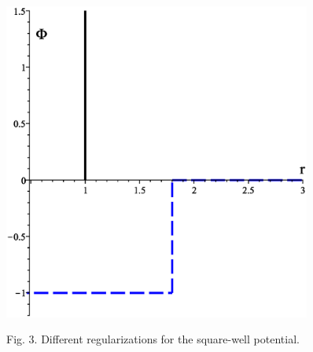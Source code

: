 \documentclass[8pt]{beamer}
\begin{document}
\begin{frame}
\begin{columns}
			\begin{figure}[htbp]
				\includegraphics[width=0.9\textwidth,angle=0]{hcsw_wca} \\
				\parbox{0.8\textwidth}{\caption*{Fig. 3. Different regularizations for the square-well potential.
				}}
			\end{figure}
						
		\end{columns}
		
	\end{frame}
	
\end{document}
